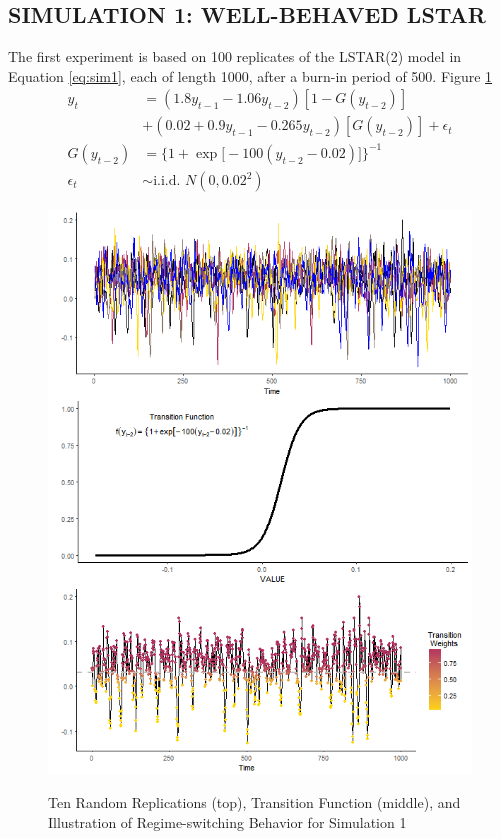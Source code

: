 \vskip 3mm

\subsection{SIMULATION 1: WELL-BEHAVED LSTAR}

The first experiment is based on 100 replicates of the LSTAR(2) model in Equation \ref{eq:sim1}, each of length 1000, after a burn-in period of 500. Figure \ref{fig:sim1plots} 
\begin{equation}
	\begin{split}
		\label{eq:sim1}
		y_t&=(1.8y_{t-1}-1.06y_{t-2})[1-G(y_{t-2})]\\ 
		&+ (0.02+0.9y_{t-1}-0.265y_{t-2})[G(y_{t-2})]+\epsilon_t\\
		G(y_{t-2})&=\bigg\{1+\exp\big[-100(y_{t-2}-0.02)\big]\bigg\}^{-1}\\
		\epsilon_t &\sim \textrm{i.i.d. }  N(0,0.02^2)
	\end{split}
\end{equation}

\begin{figure}
	\centering
	\caption{Ten Random Replications (top), Transition Function (middle), and Illustration of Regime-switching Behavior  for Simulation 1 }
	\includegraphics[scale=.7]{sim1plots}
	\label{fig:sim1plots}
\end{figure}


